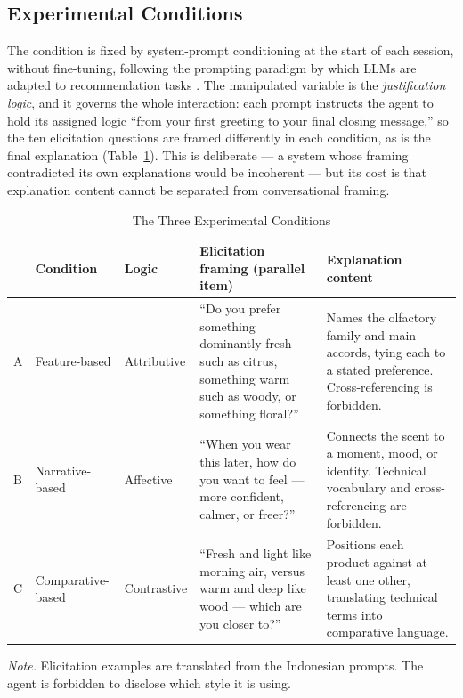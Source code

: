 \documentclass[conference]{IEEEtran}
\begin{document}
\subsection{Experimental Conditions}

The condition is fixed by system-prompt conditioning at the start of each session, without
fine-tuning, following the prompting paradigm by which LLMs are adapted to recommendation
tasks \cite{zhao2024}. The manipulated variable is the \textit{justification logic}, and it
governs the whole interaction: each prompt instructs the agent to hold its assigned logic
``from your first greeting to your final closing message,'' so the ten elicitation
questions are framed differently in each condition, as is the final explanation
(Table~\ref{tab:conditions}). This is deliberate --- a system whose framing contradicted
its own explanations would be incoherent --- but its cost is that explanation content
cannot be separated from conversational framing.

\begin{table}[htbp]
\caption{The Three Experimental Conditions}
\begin{center}
\renewcommand{\arraystretch}{1.15}
\begin{tabular}{@{}p{0.5cm}p{2.0cm}p{1.5cm}p{5.4cm}p{5.6cm}@{}}
\toprule
& \textbf{Condition} & \textbf{Logic} & \textbf{Elicitation framing (parallel item)} & \textbf{Explanation content} \\
\midrule
A & Feature-based & Attributive & ``Do you prefer something dominantly fresh such as citrus, something warm such as woody, or something floral?'' & Names the olfactory family and main accords, tying each to a stated preference. Cross-referencing is forbidden. \\
B & Narrative-based & Affective & ``When you wear this later, how do you want to feel --- more confident, calmer, or freer?'' & Connects the scent to a moment, mood, or identity. Technical vocabulary and cross-referencing are forbidden. \\
C & Comparative-based & Contrastive & ``Fresh and light like morning air, versus warm and deep like wood --- which are you closer to?'' & Positions each product against at least one other, translating technical terms into comparative language. \\
\bottomrule
\end{tabular}
\label{tab:conditions}
\end{center}
\footnotesize\textit{Note.} Elicitation examples are translated from the Indonesian
prompts. The agent is forbidden to disclose which style it is using.
\end{table}
\end{document}
